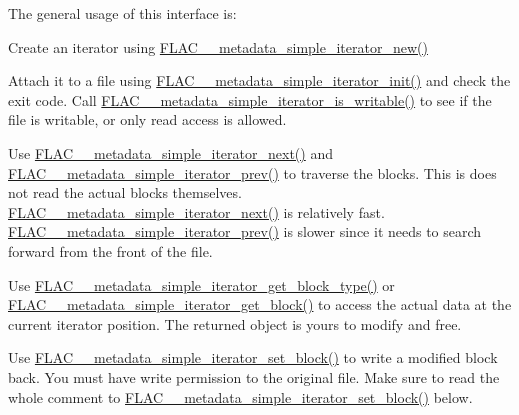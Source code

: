 The general usage of this interface is\+:


\begin{DoxyItemize}
\item Create an iterator using \hyperlink{group__flac__metadata__level1_ga5b32f4eba211e05727428e9080f4e393}{F\+L\+A\+C\+\_\+\+\_\+metadata\+\_\+simple\+\_\+iterator\+\_\+new()}
\item Attach it to a file using \hyperlink{group__flac__metadata__level1_ga2a055cca4e6e06ae62517c8b0fa6e8a3}{F\+L\+A\+C\+\_\+\+\_\+metadata\+\_\+simple\+\_\+iterator\+\_\+init()} and check the exit code. Call \hyperlink{group__flac__metadata__level1_gadc654c1361b53737bab20efa3e75a0fc}{F\+L\+A\+C\+\_\+\+\_\+metadata\+\_\+simple\+\_\+iterator\+\_\+is\+\_\+writable()} to see if the file is writable, or only read access is allowed.
\item Use \hyperlink{group__flac__metadata__level1_gacac860d14fc0ff37cc2c034d3f972320}{F\+L\+A\+C\+\_\+\+\_\+metadata\+\_\+simple\+\_\+iterator\+\_\+next()} and \hyperlink{group__flac__metadata__level1_ga49f495dec0f44116d66e1b79356a1160}{F\+L\+A\+C\+\_\+\+\_\+metadata\+\_\+simple\+\_\+iterator\+\_\+prev()} to traverse the blocks. This is does not read the actual blocks themselves. \hyperlink{group__flac__metadata__level1_gacac860d14fc0ff37cc2c034d3f972320}{F\+L\+A\+C\+\_\+\+\_\+metadata\+\_\+simple\+\_\+iterator\+\_\+next()} is relatively fast. \hyperlink{group__flac__metadata__level1_ga49f495dec0f44116d66e1b79356a1160}{F\+L\+A\+C\+\_\+\+\_\+metadata\+\_\+simple\+\_\+iterator\+\_\+prev()} is slower since it needs to search forward from the front of the file.
\item Use \hyperlink{group__flac__metadata__level1_ga4649a49d230ac8bfc3ec88f5196205bb}{F\+L\+A\+C\+\_\+\+\_\+metadata\+\_\+simple\+\_\+iterator\+\_\+get\+\_\+block\+\_\+type()} or \hyperlink{group__flac__metadata__level1_ga31c9e013b3bdc04866eee2271349fe60}{F\+L\+A\+C\+\_\+\+\_\+metadata\+\_\+simple\+\_\+iterator\+\_\+get\+\_\+block()} to access the actual data at the current iterator position. The returned object is yours to modify and free.
\item Use \hyperlink{group__flac__metadata__level1_ga7d1ceb2db292c968ae6ac18ecb15c356}{F\+L\+A\+C\+\_\+\+\_\+metadata\+\_\+simple\+\_\+iterator\+\_\+set\+\_\+block()} to write a modified block back. You must have write permission to the original file. Make sure to read the whole comment to \hyperlink{group__flac__metadata__level1_ga7d1ceb2db292c968ae6ac18ecb15c356}{F\+L\+A\+C\+\_\+\+\_\+metadata\+\_\+simple\+\_\+iterator\+\_\+set\+\_\+block()} below.

\end{DoxyItemize}
